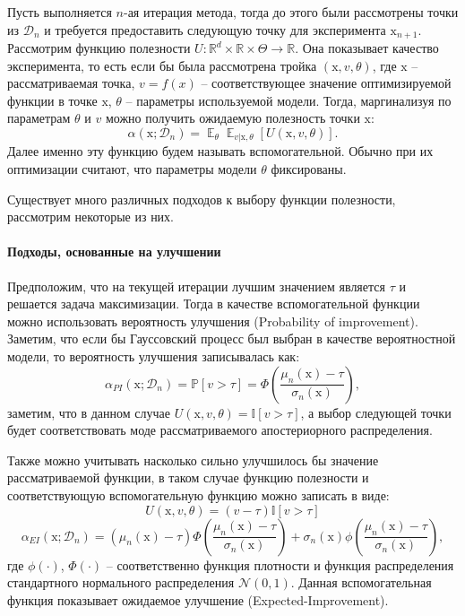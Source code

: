 \documentclass[12pt,fleqn]{article}
\DeclareMathOperator*{\E}{\mathbb{E}}
\begin{document}
Пусть выполняется $n$-ая итерация метода, тогда до этого были рассмотрены точки из $\mathcal{D}_n$ и требуется предоставить следующую точку для эксперимента $\boldsymbol{\mathrm{x}}_{n+1}$. Рассмотрим функцию полезности $U : \mathbb{R}^d \times \mathbb{R} \times \Theta \rightarrow \mathbb{R}$. Она показывает качество эксперимента, то есть если бы была рассмотрена тройка $(\boldsymbol{\mathrm{x}}, v, \theta)$, где $\boldsymbol{\mathrm{x}}$ -- рассматриваемая точка, $v = f(x)$ -- соответствующее значение оптимизируемой функции в точке $\boldsymbol{\mathrm{x}}$, $\theta$ -- параметры используемой модели. Тогда, маргинализуя по параметрам $\theta$ и $v$ можно получить ожидаемую полезность точки $\boldsymbol{\mathrm{x}}$:
$$
    \alpha(\boldsymbol{\mathrm{x}}; \mathcal{D}_n) = \E_{\theta}\E_{v| \boldsymbol{\mathrm{x}}, \theta} \left[U(\boldsymbol{\mathrm{x}}, v, \theta)\right].
$$
Далее именно эту функцию будем называть вспомогательной. Обычно при их оптимизации считают, что параметры модели $\theta$ фиксированы.

Существует много различных подходов к выбору функции полезности, рассмотрим некоторые из них.

\paragraph{Подходы, основанные на улучшении}
Предположим, что на текущей итерации лучшим значением является $\tau$ и решается задача максимизации. Тогда в качестве вспомогательной функции можно использовать вероятность улучшения (Probability of improvement). Заметим, что если бы Гауссовский процесс был выбран в качестве вероятностной модели, то вероятность улучшения записывалась как:
$$
    \alpha_{PI}(\boldsymbol{\mathrm{x}}; \mathcal{D}_n) = \mathbb{P}\left[v > \tau\right] = \Phi\left(\frac{\mu_n(\boldsymbol{\mathrm{x}}) - \tau}{\sigma_n(\boldsymbol{\mathrm{x}})}\right),
$$
заметим, что в данном случае $U(\boldsymbol{\mathrm{x}}, v, \theta) = \mathbb{I}\left[v > \tau\right]$, а выбор следующей точки будет соответствовать моде рассматриваемого апостериорного распределения.

Также можно учитывать насколько сильно улучшилось бы значение рассматриваемой функции, в таком случае функцию полезности и соответствующую вспомогательную функцию можно записать в виде:
$$
    U(\boldsymbol{\mathrm{x}}, v, \theta) = (v - \tau)\mathbb{I}\left[v > \tau\right]$$
$$
    \alpha_{EI}(\boldsymbol{\mathrm{x}}; \mathcal{D}_n) = (\mu_n(\boldsymbol{\mathrm{x}}) - \tau)\Phi\left(\frac{\mu_n(\boldsymbol{\mathrm{x}}) - \tau}{\sigma_n(\boldsymbol{\mathrm{x}})}\right) + \sigma_n(\boldsymbol{\mathrm{x}})\phi\left(\frac{\mu_n(\boldsymbol{\mathrm{x}}) - \tau}{\sigma_n(\boldsymbol{\mathrm{x}})}\right),
$$
где $\phi(\cdot)$, $\Phi(\cdot)$ -- соответственно функция плотности и функция распределения стандартного нормального распределения $\mathcal{N}(0, 1)$. Данная вспомогательная функция показывает ожидаемое улучшение (Expected-Improvement).
\end{document}
